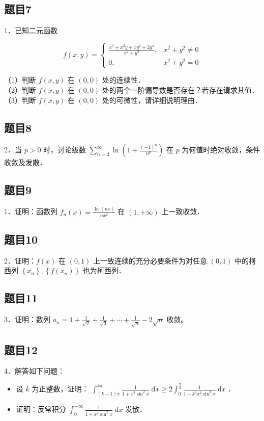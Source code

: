 \documentclass{article}
\begin{document}
\subsection{题目7}
1．已知二元函数

\[
f(x, y)= \begin{cases}\frac{x^{3}+x^{2} y+x y^{2}+2 y^{4}}{x^{2}+y^{2}}, & x^{2}+y^{2} \neq 0 \\ 0, & x^{2}+y^{2}=0\end{cases}
\]

（1）判断 \(f(x, y)\) 在 \((0,0)\) 处的连续性．\\
（2）判断 \(f(x, y)\) 在 \((0,0)\) 处的两个一阶偏导数是否存在？若存在请求其值．\\
（3）判断 \(f(x, y)\) 在 \((0,0)\) 处的可微性，请详细说明理由．

\subsection{题目8}
2．当 \(p>0\) 时，讨论级数 \(\sum_{n=2}^{\infty} \ln \left(1+\frac{(-1)^{n}}{n^{p}}\right)\) 在 \(p\) 为何值时绝对收敛，条件收敛及发散．

\subsection{题目9}
1．证明：函数列 \(f_{n}(x)=\frac{\ln (n x)}{n x^{2}}\) 在 \((1,+\infty)\) 上一致收敛．

\subsection{题目10}
2．证明：\(f(x)\) 在 \((0,1)\) 上一致连续的充分必要条件为对任意 \((0,1)\) 中的柯西列 \(\left\{x_{n}\right\},\left\{f\left(x_{n}\right)\right\}\) 也为柯西列．

\subsection{题目11}
3．证明：数列 \(a_{n}=1+\frac{1}{\sqrt{2}}+\frac{1}{\sqrt{3}}+\cdots+\frac{1}{\sqrt{n}}-2 \sqrt{n}\) 收敛。

\subsection{题目12}
4．解答如下问题：

\begin{itemize}
  \item[（1）] 设 \(k\) 为正整数，证明： \(\int_{(k-1) \pi}^{k \pi} \frac{1}{1+x^{2} \sin ^{2} x} \mathrm{~d} x \geq 2 \int_{0}^{\frac{\pi}{2}} \frac{1}{1+k^{2} \pi^{2} \sin ^{2} x} \mathrm{~d} x\) ．
  \item[（2）] 证明：反常积分 \(\int_{0}^{+\infty} \frac{1}{1+x^{2} \sin ^{2} x} \mathrm{~d} x\) 发散．
\end{itemize}
\end{document}
